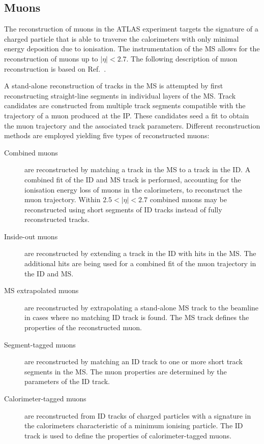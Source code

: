 \subsection{Muons}%
\label{sec:muon_rec}

The reconstruction of muons in the ATLAS experiment targets the signature of a
charged particle that is able to traverse the calorimeters with only minimal
energy deposition due to ionisation. The instrumentation of the MS allows for
the reconstruction of muons up to $|\eta| < 2.7$. The following description of
muon reconstruction is based on Ref.~\cite{MUON-2018-03}.

A stand-alone reconstruction of tracks in the MS is attempted by first
reconstructing straight-line segments in individual layers of the MS. Track
candidates are constructed from multiple track segments compatible with the
trajectory of a muon produced at the IP. These candidates seed a
fit to obtain the muon trajectory and the associated track parameters. Different
reconstruction methods are employed yielding five types of reconstructed muons:
\begin{description}

\item[Combined muons] are reconstructed by matching a track in the MS to a track
  in the ID. A combined fit of the ID and MS track is performed, accounting for
  the ionisation energy loss of muons in the calorimeters, to reconstruct the
  muon trajectory. Within $2.5 < |\eta| < 2.7$ combined muons may be
  reconstructed using short segments of ID tracks instead of fully reconstructed
  tracks.

\item[Inside-out muons] are reconstructed by extending a track in the ID with
  hits in the MS. The additional hits are being used for a combined fit of the
  muon trajectory in the ID and MS.

\item[MS extrapolated muons] are reconstructed by extrapolating a stand-alone MS
  track to the beamline in cases where no matching ID track is found. The MS
  track defines the properties of the reconstructed muon. %

\item[Segment-tagged muons] are reconstructed by matching an ID track to one or
  more short track segments in the MS. The muon properties are determined by the
  parameters of the ID track.

\item[Calorimeter-tagged muons] are reconstructed from ID tracks of charged
  particles with a signature in the calorimeters characteristic of a minimum
  ionising particle. The ID track is used to define the properties of
  calorimeter-tagged muons.

\end{description}
